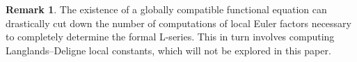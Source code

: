 \documentclass{article}
\theoremstyle{definition}
\theoremstyle{definition}
\newtheorem{remark}[n]{Remark}
\begin{document}
\pagebreak

\begin{remark}
The existence of a globally compatible functional equation can drastically cut down the number of computations of local Euler factors necessary to completely determine the formal L-series. This in turn involves computing Langlands--Deligne local constants, which will not be explored in this paper.
\end{remark}

\def\abstractname{Acknowledgements}

\begin{abstract}
I would like to thank Vladimir Dokchitser for guidance throughout. This work was supported by the Engineering and Physical Sciences Research Council [EP/S021590/1], the EPSRC Centre for Doctoral Training in Geometry and Number Theory (The London School of Geometry and Number Theory), University College London.
\end{abstract}


\end{document}
